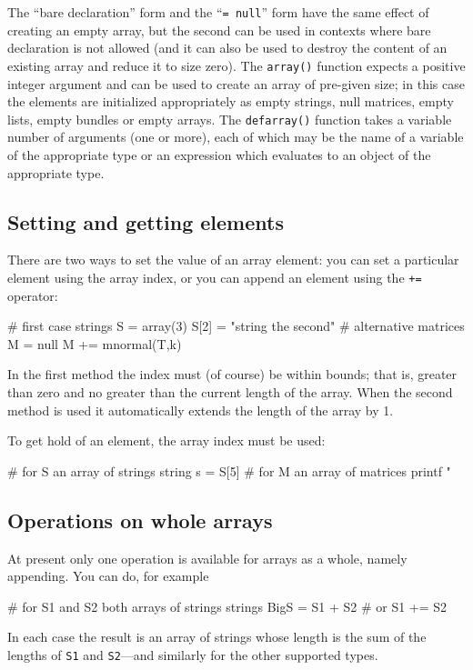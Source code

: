 The ``bare declaration'' form and the ``\texttt{= null}'' form have
the same effect of creating an empty array, but the second can be used
in contexts where bare declaration is not allowed (and it can also be
used to destroy the content of an existing array and reduce it to size
zero). The \texttt{array()} function expects a positive integer
argument and can be used to create an array of pre-given size; in this
case the elements are initialized appropriately as empty strings, null
matrices, empty lists, empty bundles or empty arrays. The
\texttt{defarray()} function takes a variable number of arguments (one
or more), each of which may be the name of a variable of the
appropriate type or an expression which evaluates to an object of the
appropriate type.

\subsection{Setting and getting elements}

There are two ways to set the value of an array element: you can set a
particular element using the array index, or you can append an element
using the \texttt{+=} operator:
\begin{code}
# first case
strings S = array(3)
S[2] = "string the second"
# alternative
matrices M = null
M += mnormal(T,k)
\end{code}

In the first method the index must (of course) be within bounds; that
is, greater than zero and no greater than the current length of the
array. When the second method is used it automatically extends the
length of the array by 1.

To get hold of an element, the array index must be used:
\begin{code}
# for S an array of strings
string s = S[5]
# for M an array of matrices
printf "\n%
\end{code}

\subsection{Operations on whole arrays}

At present only one operation is available for arrays as a whole,
namely appending. You can do, for example
\begin{code}
# for S1 and S2 both arrays of strings
strings BigS = S1 + S2
# or
S1 += S2
\end{code}
In each case the result is an array of strings whose length is the sum
of the lengths of \texttt{S1} and \texttt{S2}---and similarly for the
other supported types.

